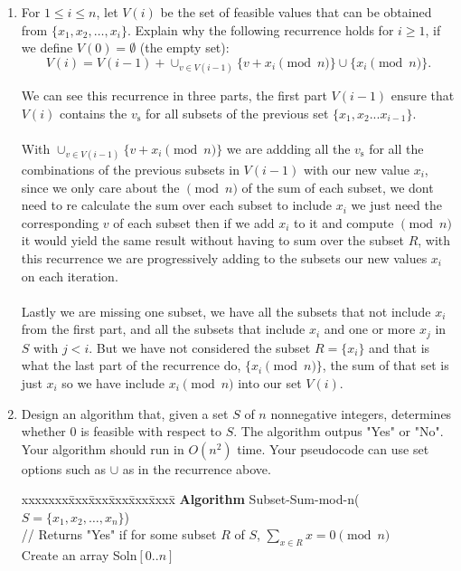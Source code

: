 \documentclass[11pt]{article}
\def\question#1{\red{#1}}
\def\soln#1{\par\blu{#1}} %
\def\blu#1{{\color{blu}#1}}
\def\red#1{{\color{red}#1}}
\begin{document}
\begin{enumerate}
\item For $1 \le i \le n$, let $V(i)$ be the set of feasible values that can
be obtained from $\{x_1, x_2, \ldots, x_i\}$.
\question{Explain why the following recurrence holds for $i \ge 1$, if we define
$V(0) = \emptyset$ (the empty set):}
 \[
    V(i) = V(i-1) + \cup_{v \in V(i-1)} \{ v + x_i \pmod n \} \cup \{ x_i \pmod n \}.
    \]
\soln{
   We can see this recurrence in three parts, the first part $V(i-1)$ ensure that $V(i)$ contains
   the $v_{\text{s}}$ for all subsets of the previous set $\{x_1, x_2 ... x_{i-1}\}$. \\ \\
   With $\cup_{v \in V(i-1)} \{ v + x_i \pmod n \}$ we are addding all the $v_{\text{s}}$ for all the 
   combinations of the previous subsets in $V(i-1)$ with our new value $x_i$, since we only care 
   about the $\pmod n$ of the sum of each subset, we dont need to re calculate the sum over each 
   subset to include $x_i$ we just need the corresponding $v$ of each subset then if we add $x_i$ to 
   it and compute $\pmod n$ it would yield the same result without having to sum over the subset $R$, 
   with this recurrence we are progressively adding to the subsets our new values $x_i$ on each iteration. \\ \\
   Lastly we are missing one subset, we have all the subsets that not include $x_i$ from the 
   first part, and all the subsets that include $x_i$ and one or more $x_j$ in $S$ with $j < i$. 
   But we have not considered the subset $R = \{x_i\}$ and that is what the last part of the 
   recurrence do, $\{ x_i \pmod n \}$, the sum of that set is just $x_i$ so we have include 
   $x_i \pmod n$ into our set $V(i)$. \\
}
\item \question{Design an algorithm that, given a set $S$ of $n$ nonnegative
integers, determines whether 0 is feasible with respect to $S$.} The
algorithm outpus "Yes" or "No".  Your algorithm should run in
$O(n^2)$ time. Your pseudocode can use set options such as $\cup$ as
in the recurrence above.
\soln{
\begin{tabbing}
xxxxxxx\=xxx\=xxx\=xxx\=xxx\=xxxx\= \kill
\> {\bf Algorithm} Subset-Sum-mod-n($S = \{x_1,x_2,\ldots,x_n\}$) \\
\>\> // Returns "Yes" if for some subset $R$ of $S$, $\sum_{x \in R} x = 0 \pmod n$   \\
\>\> Create an array Soln$[0..n]$ \\

\end{tabbing}}
\end{enumerate}
\end{document}
